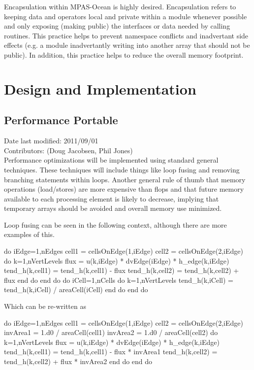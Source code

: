 \documentclass[11pt]{report}
\begin{document}
Encapsulation within MPAS-Ocean is highly desired.  Encapsulation refers to keeping data and operators local and private within a module whenever possible and only exposing (making public) the interfaces or data needed by calling routines.  This practice helps to prevent namespace conflicts and inadvertant side effects (e.g. a module inadvertantly writing into another array that should not be public). In addition, this practice helps to reduce the overall memory footprint.


\chapter{Design and Implementation}

\section{Performance Portable}
Date last modified: 2011/09/01 \\
Contributors: (Doug Jacobsen, Phil Jones) \\

Performance optimizations will be implemented using standard general techniques. These techniques will include things like loop fusing and removing branching statements within loops. Another general rule of thumb that memory operations (load/stores) are more expensive than flops and that future memory available to each processing element is likely to decrease, implying that temporary arrays should be avoided and overall memory use minimized. 

Loop fusing can be seen in the following context, although there are more examples of this.

\begin{verbatimtab}
do iEdge=1,nEdges
	cell1 = cellsOnEdge(1,iEdge)
	cell2 = cellsOnEdge(2,iEdge)
	do k=1,nVertLevels
		flux = u(k,iEdge) * dvEdge(iEdge) * h_edge(k,iEdge)
		tend_h(k,cell1) = tend_h(k,cell1) - flux 
		tend_h(k,cell2) = tend_h(k,cell2) + flux 
	end do
end do
do iCell=1,nCells
	do k=1,nVertLevels
		tend_h(k,iCell) = tend_h(k,iCell) / areaCell(iCell)
	end do
end do
\end{verbatimtab}

Which can be re-written as

\begin{verbatimtab}
do iEdge=1,nEdges
	cell1 = cellsOnEdge(1,iEdge)
	cell2 = cellsOnEdge(2,iEdge)
	invArea1 = 1.d0 / areaCell(cell1)
	invArea2 = 1.d0 / areaCell(cell2)
	do k=1,nVertLevels
		flux = u(k,iEdge) * dvEdge(iEdge) * h_edge(k,iEdge)
		tend_h(k,cell1) = tend_h(k,cell1) - flux * invArea1
		tend_h(k,cell2) = tend_h(k,cell2) + flux * invArea2
	end do
end do
\end{verbatimtab}
\end{document}
